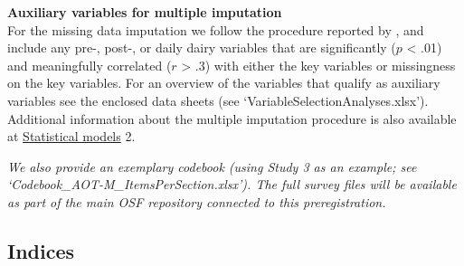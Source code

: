 \documentclass[]{article}
\begin{document}
\textbf{Auxiliary variables for multiple imputation}\\
For the missing data imputation we follow the procedure reported by
\citet{Monden2015}, and include any pre-, post-, or daily dairy
variables that are significantly (\(p\) \textless{} .01) and
meaningfully correlated (\(r\) \textgreater{} .3) with either the key
variables or missingness on the key variables. For an overview of the
variables that qualify as auxiliary variables see the enclosed data
sheets (see `VariableSelectionAnalyses.xlsx'). Additional information
about the multiple imputation procedure is also available at
\protect\hyperlink{statistical-models}{Statistical models} 2.

\emph{We also provide an exemplary codebook (using Study 3 as an
example; see `Codebook\_AOT-M\_ItemsPerSection.xlsx'). The full survey
files will be available as part of the main OSF repository connected to
this preregistration.}

\hypertarget{indices}{%
\subsection{Indices}\label{indices}}
\end{document}
